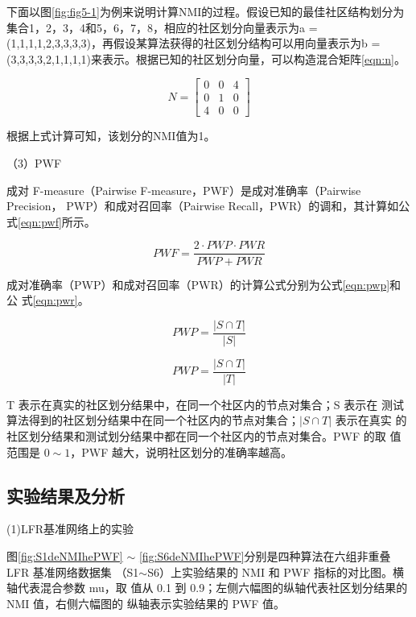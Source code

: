 下面以图\ref{fig:fig5-1}为例来说明计算NMI的过程。假设已知的最佳社区结构划分为集合{1，2，3，4}和{5，6，7，8}，相应的社区划分向量表示为a = (1,1,1,1,2,3,3,3,3)，再假设某算法获得的社区划分结构可以用向量表示为b = (3,3,3,3,2,1,1,1,1)来表示。根据已知的社区划分向量，可以构造混合矩阵\ref{eqn:n}。

\begin{equation}
  \label{eqn:n}
  N=\begin{bmatrix}
    0 & 0 &4 \\ 
    0 & 1 & 0\\ 
    4 & 0 & 0
    \end{bmatrix}
\end{equation}

根据上式计算可知，该划分的NMI值为1。

（3）PWF

成对 F-measure（Pairwise F-measure，PWF）是成对准确率（Pairwise Precision，
PWP）和成对召回率（Pairwise Recall，PWR）的调和，其计算如公式\ref{eqn:pwf}所示。

\begin{equation}
  \label{eqn:pwf}
  PWF=\frac{2\cdot PWP\cdot PWR}{PWP+PWR}
\end{equation}

成对准确率（PWP）和成对召回率（PWR）的计算公式分别为公式\ref{eqn:pwp}和公
式\ref{eqn:pwr}。

\begin{equation}
  \label{eqn:pwp}
  PWP=\frac{ \left | S \cap T \right |}{ \left | S \right |}
\end{equation}

\begin{equation}
  \label{eqn:pwr}
  PWP=\frac{ \left | S \cap T \right |}{ \left | T \right |}
\end{equation}

T 表示在真实的社区划分结果中，在同一个社区内的节点对集合；S 表示在
测试算法得到的社区划分结果中在同一个社区内的节点对集合；$\left | S \cap T \right |$ 表示在真实
的社区划分结果和测试划分结果中都在同一个社区内的节点对集合。PWF 的取
值范围是 $0 \sim 1$，PWF 越大，说明社区划分的准确率越高。

\subsection{实验结果及分析}

(1)LFR基准网络上的实验

图\ref{fig:S1deNMIhePWF} $\sim$ \ref{fig:S6deNMIhePWF}分别是四种算法在六组非重叠 LFR 基准网络数据集
（S1$\sim$S6）上实验结果的 NMI 和 PWF 指标的对比图。横轴代表混合参数 mu，取
值从 0.1 到 0.9；左侧六幅图的纵轴代表社区划分结果的 NMI 值，右侧六幅图的
纵轴表示实验结果的 PWF 值。

